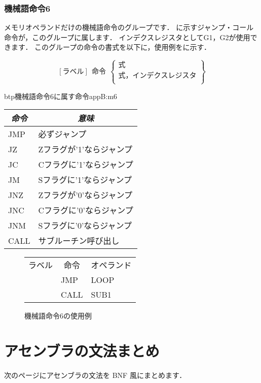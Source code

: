 \subsubsection{機械語命令6}
メモリオペランドだけの機械語命令のグループです．
に示すジャンプ・コール命令が，このグループに属します．
インデクスレジスタとしてG1，G2が使用できます．
このグループの命令の書式を以下に，使用例をに示す．

{\small\[ %
[ラベル]~~命令~~\left\{
  \begin{array}{c}
   式 \\
   式，インデクスレジスタ \\
  \end{array}  
 \right\}
 \]}

\begin{mytable}{btp}{機械語命令6に属す命令}{appB:m6}
{\small\begin{tabular}{l|l}
\hline\hline
\multicolumn{1}{c|}{\it 命令} & \multicolumn{1}{c}{\it 意味} \\
\hline
JMP & 必ずジャンプ \\
JZ  & Zフラグが'1'ならジャンプ \\
JC  & Cフラグに'1'ならジャンプ \\
JM  & Sフラグに'1'ならジャンプ \\
JNZ & Zフラグが'0'ならジャンプ \\
JNC & Cフラグに'0'ならジャンプ \\
JNM & Sフラグに'0'ならジャンプ \\
CALL & サブルーチン呼び出し
\end{tabular}}
\end{mytable}

\begin{figure}[btp]
\begin{center}
{\tt\small\begin{tabular}{|l|l|l|}
\hline
\hline
\multicolumn{1}{|c|}{ラベル} & 
        \multicolumn{1}{c|}{命令} & \multicolumn{1}{c|}{オペランド} \\
  & JMP & LOOP \\
  & CALL & SUB1 \\
\hline
\end{tabular}}
\caption{機械語命令6の使用例}
\label{fig:appB:m6ex}
\end{center}
\end{figure}

\section{アセンブラの文法まとめ}
次のページにアセンブラの文法を BNF 風にまとめます．

